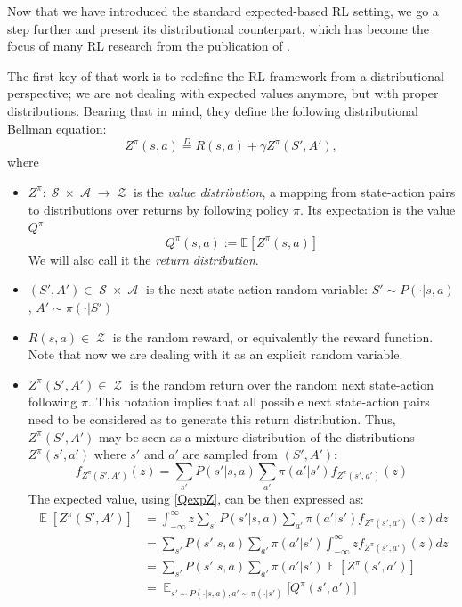 \documentclass[12pt,a4paper,openright,twoside]{article}
\DeclareMathOperator*{\E}{\mathbb{E}}
\DeclareMathOperator*{\Sspace}{\mathcal{S}}
\DeclareMathOperator*{\A}{\mathcal{A}}
\DeclareMathOperator*{\Z}{\mathcal{Z}}
\numberwithin{equation}{section}
\theoremstyle{definition}
\theoremstyle{remark}
\theoremstyle{plain}
\begin{document}
Now that we have introduced the standard expected-based RL setting, we go a step further and present its distributional counterpart, which has become the focus of many RL research from the publication of \cite{DRL}.

The first key of that work is to redefine the RL framework from a distributional perspective; we are not dealing with expected values anymore, but with proper distributions. Bearing that in mind, they define the following distributional Bellman equation:
\begin{equation} \label{distBE}
    Z^{\pi}(s,a) \stackrel{D}{=} R(s,a) + \gamma Z^{\pi}(S',A'),
\end{equation}
where
\begin{itemize}
    \item $Z^\pi: \Sspace \times \A \rightarrow \Z$ is the \textit{value distribution}, a mapping from state-action pairs to distributions over returns by following policy $\pi$. Its expectation is the value $Q^\pi$
    	\begin{equation} \label{QexpZ}
        		Q^\pi(s,a) := \mathbb{E} [Z^\pi(s,a)]
    	\end{equation}
    	We will also call it the \textit{return distribution}.
    \item $(S',A') \in \Sspace \times \A$ is the next state-action random variable: $S'\sim P(\cdot | s,a)$, $A' \sim \pi(\cdot | S')$
    \item $R(s,a) \in \Z$ is the random reward, or equivalently the reward function. Note that now we are dealing with it as an explicit random variable.
    \item $Z^\pi(S',A') \in \Z$ is the random return over the random next state-action following $\pi$. This notation implies that all possible next state-action pairs need to be considered as to generate this return distribution. Thus, $Z^\pi(S',A')$ may be seen as a mixture distribution of the distributions $Z^\pi(s',a')$ where $s'$ and $a'$ are sampled from $(S',A')$:
    \begin{equation}
        f_{Z^\pi(S',A')} (z) = \sum_{s'} P(s' | s,a) \sum_{a'} \pi(a'|s') f_{Z^\pi(s',a')}(z)
    \end{equation}
    The expected value, using \ref{QexpZ}, can be then expressed as:
    \begin{equation} \label{expNextRandomReturn}
    \begin{split}
        \E[Z^\pi(S',A')] &=  \int_{-\infty}^{\infty} z \sum_{s'} P(s' | s,a) \sum_{a'} \pi(a'|s') f_{Z^\pi(s',a')}(z) dz \\
        &=  \sum_{s'} P(s' | s,a) \sum_{a'} \pi(a'|s') \int_{-\infty}^{\infty} z f_{Z^\pi(s',a')}(z) dz \\
        &=  \sum_{s'} P(s' | s,a) \sum_{a'} \pi(a'|s') \E[Z^\pi(s',a')] \\
        &= \E_{s'\sim P(\cdot | s,a), a' \sim \pi(\cdot | s')} \bigg[Q^\pi(s',a') \bigg] 
    \end{split}
    \end{equation}
\end{itemize}
\end{document}
